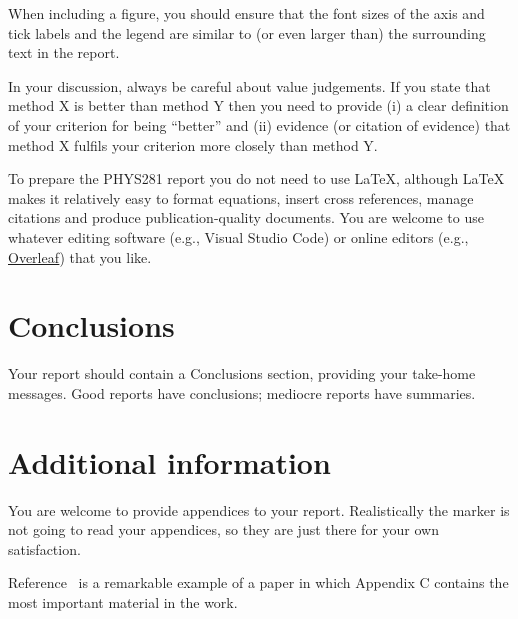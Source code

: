 \documentclass[a4,12pt]{article}
\begin{document}
When including a figure, you should ensure that the font sizes of the
axis and tick labels and the legend are similar to (or even larger
than) the surrounding text in the report.

In your discussion, always be careful about value judgements.  If you
state that method X is better than method Y then you need to provide
(i) a clear definition of your criterion for being ``better'' and (ii)
evidence (or citation of evidence) that method X fulfils your
criterion more closely than method Y\@.

To prepare the PHYS281 report you do not need to use LaTeX, although
LaTeX makes it relatively easy to format equations, insert cross
references, manage citations and produce publication-quality
documents.  You are welcome to use whatever editing software (e.g.,
Visual Studio Code) or online editors (e.g.,
\href{https://www.overleaf.com/}{Overleaf}) that you like.

\section{Conclusions}

Your report should contain a Conclusions section, providing your
take-home messages.  Good reports have conclusions; mediocre reports
have summaries.

\appendix

\section{Additional information}

You are welcome to provide appendices to your report.  Realistically
the marker is not going to read your appendices, so they are just
there for your own satisfaction.

Reference~\cite{Perdew} is a remarkable example of a paper in which
Appendix C contains the most important material in the work.


\end{document}
